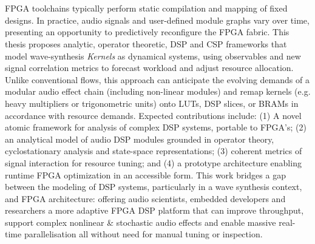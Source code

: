 \chapter*{}

FPGA toolchains typically perform static compilation and mapping of fixed designs. In practice, audio signals and user-defined module graphs vary over time, presenting an opportunity to predictively reconfigure the FPGA fabric. This thesis proposes analytic, operator theoretic, DSP and CSP frameworks that model wave-synthesis \textit{Kernels} as dynamical systems, using observables and new signal correlation metrics to forecast workload and adjust resource allocation. Unlike conventional flows, this approach can anticipate the evolving demands of a modular audio effect chain (including non-linear modules) and remap kernels (e.g. heavy multipliers or trigonometric units) onto LUTs, DSP slices, or BRAMs in accordance with resource demands. Expected contributions include: (1) A novel atomic framework for analysis of complex DSP systems, portable to FPGA's; (2) an analytical model of audio DSP modules grounded in operator theory, cyclostationary analysis and state-space representations; (3) coherent metrics of signal interaction for resource tuning; and (4) a prototype architecture enabling runtime FPGA optimization in an accessible form. This work bridges a gap between the modeling of DSP systems, particularly in a wave synthesis context, and FPGA architecture: offering audio scientists, embedded developers and researchers a more adaptive FPGA DSP platform that can improve throughput, support complex nonlinear \& stochastic audio effects and enable massive real-time parallelisation all without need for manual tuning or inspection.
